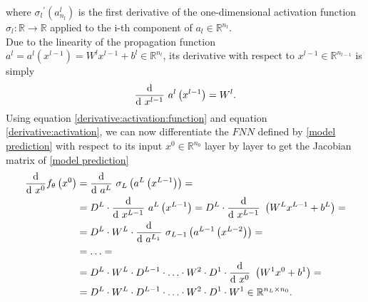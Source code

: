 where ${\sigma_{l}}^{\prime} \left( a^{l}_{n_l} \right)$ is the first derivative of the one-dimensional activation function $\sigma_{l} \colon \mathbb{R} \to \mathbb{R}$ applied to the i-th component of $a_l \in \mathbb{R}^{n_l}$. \\
Due to the linearity of the propagation function $a^l = a^l\left(x^{l-1}\right) = W^{l} x^{l-1} + b^{l} \in \mathbb{R}^{n_l}$, its derivative with respect to $x^{l-1} \in \mathbb{R}^{n_{l-1}}$ is simply
\begin{equation}
    \label{derivative:activation}
    \frac{\textup{d}}{\textup{d} \ x^{l-1}} \ a^{l}\left(x^{l-1}\right) = W^l.
\end{equation}
Using equation \cref{derivative:activation:function} and equation \cref{derivative:activation}, we can now differentiate the $FNN$ defined by \cref{model prediction} with respect to its input $x^0 \in \mathbb{R}^{n_0}$ layer by layer to get the Jacobian matrix of \cref{model prediction}
\begin{align}
    \label{first order derivative}
    \frac{\textup{d}}{\textup{d} \ x^0} f_{\theta}\left(x^0\right) & = \frac{\textup{d}}{\textup{d} \ a^{L}} \ \sigma_{L} \left(a^{L}\left(x^{L-1}\right)\right) = \\
    & = D^L \cdot \frac{\textup{d}}{\textup{d} \ x^{L-1}} \ a^{L}\left(x^{L-1}\right) = D^L \cdot \frac{\textup{d}}{\textup{d} \ x^{L-1}} \ \left(W^{L} x^{L-1} + b^{L}\right) = \\
    & = D^L \cdot W^L \cdot \frac{\textup{d}}{\textup{d} \ a^{L_1}} \ \sigma_{L-1} \left(a^{L-1}\left(x^{L-2}\right)\right) = \\
    & = \ldots = \\
    & = D^L \cdot W^L \cdot D^{L-1} \cdot \ldots \cdot W^2 \cdot D^1 \cdot \frac{\textup{d}}{\textup{d} \ x^{0}} \ \left(W^{1} x^{0} + b^{1}\right) = \\
    & = D^L \cdot W^L \cdot D^{L-1} \cdot \ldots \cdot W^2 \cdot D^1 \cdot W^{1} \in \mathbb{R}^{n_L \times n_0}.
\end{align}

